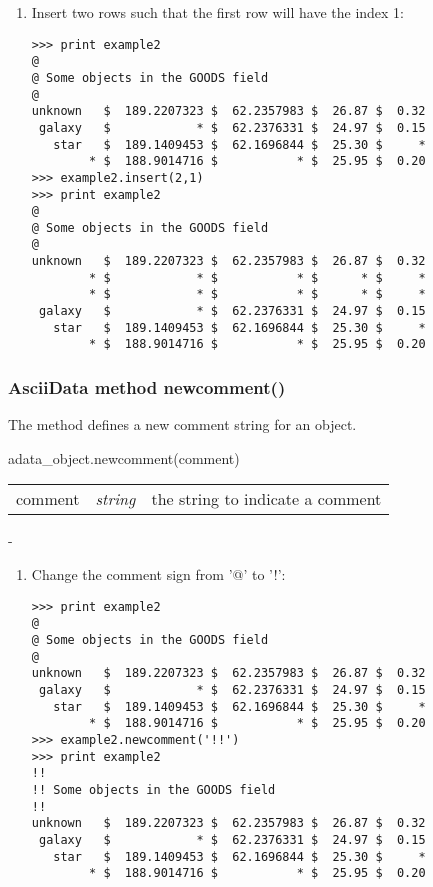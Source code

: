 \begin{enumerate}
\item Insert two rows such that the first row will have the index 1:
\begin{small}
\begin{verbatim}
>>> print example2
@
@ Some objects in the GOODS field
@
unknown   $  189.2207323 $  62.2357983 $  26.87 $  0.32
 galaxy   $            * $  62.2376331 $  24.97 $  0.15
   star   $  189.1409453 $  62.1696844 $  25.30 $     *
        * $  188.9014716 $           * $  25.95 $  0.20
>>> example2.insert(2,1)
>>> print example2
@
@ Some objects in the GOODS field
@
unknown   $  189.2207323 $  62.2357983 $  26.87 $  0.32
        * $            * $           * $      * $     *
        * $            * $           * $      * $     *
 galaxy   $            * $  62.2376331 $  24.97 $  0.15
   star   $  189.1409453 $  62.1696844 $  25.30 $     *
        * $  188.9014716 $           * $  25.95 $  0.20
\end{verbatim}
\end{small}
\end{enumerate}

\subsubsection{AsciiData method newcomment()}
\label{adm_newcomment}
The method defines a new comment string for an \ad object.

adata\_object.newcomment(comment)

\begin{tabular}{lcl}
comment &{\it string}& the string to indicate a comment\\
\end{tabular}

-

\begin{enumerate}
\item Change the comment sign from '@' to '!':
\begin{small}
\begin{verbatim}
>>> print example2
@
@ Some objects in the GOODS field
@
unknown   $  189.2207323 $  62.2357983 $  26.87 $  0.32
 galaxy   $            * $  62.2376331 $  24.97 $  0.15
   star   $  189.1409453 $  62.1696844 $  25.30 $     *
        * $  188.9014716 $           * $  25.95 $  0.20
>>> example2.newcomment('!!')
>>> print example2
!!
!! Some objects in the GOODS field
!!
unknown   $  189.2207323 $  62.2357983 $  26.87 $  0.32
 galaxy   $            * $  62.2376331 $  24.97 $  0.15
   star   $  189.1409453 $  62.1696844 $  25.30 $     *
        * $  188.9014716 $           * $  25.95 $  0.20
\end{verbatim}
\end{small}
\end{enumerate}

